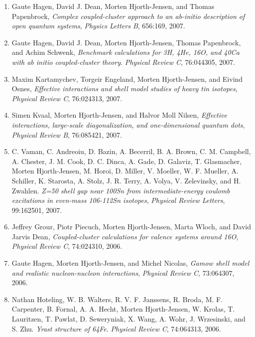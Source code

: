 \documentclass[a4wide,10pt]{article}
\begin{document}
\begin{enumerate}
\item Gaute Hagen, David J. Dean, Morten Hjorth-Jensen, and Thomas Papenbrock,  \emph{Complex coupled-cluster approach to an ab-initio description of   open quantum systems},  \emph{Physics Letters B}, 656:169, 2007. 

\item Gaute Hagen, David J. Dean, Morten Hjorth-Jensen, Thomas Papenbrock, and Achim   Schwenk,  \emph{Benchmark calculations for 3H, 4He, 16O, and 40Ca with ab initio coupled-cluster theory}.  \emph{Physical Review C}, 76:044305, 2007. 

\item Maxim Kartamychev, Torgeir Engeland, Morten Hjorth-Jensen, and Eivind Osnes,  \emph{Effective interactions and shell model studies of heavy tin isotopes},  \emph{Physical Review C}, 76:024313, 2007. 

\item Simen Kvaal, Morten Hjorth-Jensen, and Halvor Moll Nilsen,  \emph{Effective interactions, large-scale diagonalization, and   one-dimensional quantum dots},  \emph{Physical Review B}, 76:085421, 2007. 

\item C. Vaman, C. Andreoiu, D. Bazin, A. Becerril, B. A. Brown, C. M. Campbell,   A. Chester, J. M. Cook, D. C. Dinca, A. Gade, D. Galaviz, T. Glasmacher,   Morten Hjorth-Jensen, M. Horoi, D. Miller, V. Moeller, W. F. Mueller,   A. Schiller, K. Starosta, A. Stolz, J. R. Terry, A. Volya, V. Zelevinsky, and   H. Zwahlen.  \emph{Z=50 shell gap near 100Sn from intermediate-energy coulomb excitations in even-mass 106-112Sn isotopes},  \emph{Physical Review Letters}, 99:162501, 2007. 

\item Jeffrey Grour, Piotr Piecuch, Morten Hjorth-Jensen, Marta Wloch, and   David Jarvis Dean, \emph{Coupled-cluster calculations for valence systems around 16O}, \emph{Physical Review C}, 74:024310, 2006. 

\item Gaute Hagen, Morten Hjorth-Jensen, and Michel Nicolas,  \emph{Gamow shell model and realistic nucleon-nucleon interactions},  \emph{Physical Review C}, 73:064307, 2006. 

\item Nathan Hoteling, W. B. Walters, R. V. F. Janssens, R. Broda, M. F. Carpenter,   B. Fornal, A. A. Hecht, Morten Hjorth-Jensen, W. Krolas, T. Lauritzen,   T. Pawlat, D. Seweryniak, X. Wang, A. Wohr, J. Wrzesinski, and S. Zhu.  \emph{Yrast structure of 64Fe}.  \emph{Physical Review C}, 74:064313, 2006. 


\end{enumerate}
\end{document}
